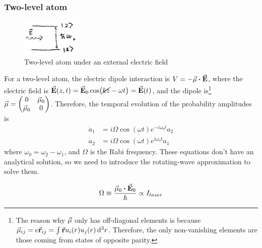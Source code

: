 \subsubsection*{Two-level atom}
\begin{figure}[H]
	\centering
	\includegraphics[width=0.25\textwidth]{./images/3-schrodinger-two-level}
	\caption{Two-level atom under an external electric field}
	\label{fig:schrodinger-two-level}
\end{figure}
For a two-level atom, the electric dipole interaction is $V = - \va{\mu} \vdot \va{E}$, where the electric field is $\va{E}(z,t) = \va{E}_{0} \cos(\cancel{kz} - \omega t ) = \va{E}(t)$, and the dipole is\footnote{The reason why $\va{\mu}$ only has off-diagonal elements is because $\va{\mu}_{ij} = e \va{r}_{ij} = \int \va{r} u_{i}(r) u_{j}(r) \dd[3]{r}$. Therefore, the only non-vanishing elements are those coming from states of opposite parity.} $\va{\mu} = \mqty(0 & \va{\mu}_{0} \\ \va{\mu}_{0} & 0)$. Therefore, the temporal evolution of the probability amplitudes is
\begin{subequations}
\begin{align}
	\dot{a}_{1} &= i \Omega \cos(\omega t) e^{-i \omega_{0} t} a_{2} \\
	\dot{a}_{2} &= i \Omega \cos(\omega t) e^{i \omega_{0} t} a_{1}
\end{align}
\end{subequations}
where $\omega_{0} = \omega_{2} - \omega_{1}$, and $\Omega$ is the Rabi frequency. These equations don't have an analytical solution, so we need to introduce the rotating-wave approximation to solve them.

\begin{defi}
	\begin{align}
		\Omega \equiv \frac{\va{\mu}_{0} \vdot \va{E}_{0}}{\hbar} \propto I_{laser}
	\end{align}
\end{defi}

